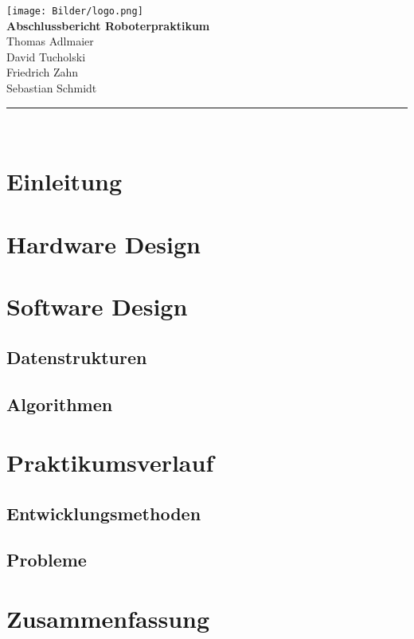 \documentclass[a4paper, 12pt]{scrartcl}
\begin{document}
\begin{titlepage}
\begin{center}
\texttt{[image: Bilder/logo.png]}\\[2.3cm]
{\huge\textsf{\textbf{ Abschlussbericht Roboterpraktikum}}}\\[1.5cm]
{\Large Thomas Adlmaier\\ David Tucholski\\ Friedrich Zahn\\[7pt]Sebastian Schmidt}\\[1cm]
\rule{\linewidth}{.5mm}\\[1.7cm]
\end{center}
\tableofcontents
\end{titlepage}

\section{Einleitung}
\lipsum
\section{Hardware Design}
\lipsum
\section{Software Design}
\subsection{Datenstrukturen}
\lipsum
\subsection{Algorithmen}
\lipsum
\section{Praktikumsverlauf}
\subsection{Entwicklungsmethoden}
\lipsum
\subsection{Probleme}
\lipsum
\section{Zusammenfassung}
\lipsum
\end{document}
